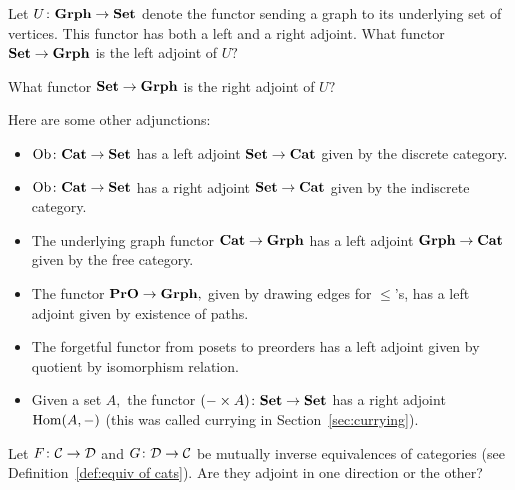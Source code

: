 \documentclass[../main/CT4S-EN-RU]{subfiles}
\begin{document}
\begin{exampleRUS}
\end{exampleRUS}

\begin{exerciseENG}
Let $U\colon{\mathbf{Grph}}\rightarrow{\mathbf{Set}}$ denote the functor sending a graph to its underlying set of vertices. This functor has both a left and a right adjoint. 
\sexc What functor ${\mathbf{Set}}\rightarrow{\mathbf{Grph}}$ is the left adjoint of $U?$
\item What functor ${\mathbf{Set}}\rightarrow{\mathbf{Grph}}$ is the right adjoint of $U?$
\endsexc
\end{exerciseENG}

\begin{exerciseRUS}
\end{exerciseRUS}

\begin{exampleENG}\label{ex:other adjunctions}
Here are some other adjunctions:

\begin{itemize}
\item $\operatorname{Ob}\colon{\mathbf{Cat}}\rightarrow{\mathbf{Set}}$ has a left adjoint ${\mathbf{Set}}\rightarrow{\mathbf{Cat}}$ given by the discrete category.
\item $\operatorname{Ob}\colon{\mathbf{Cat}}\rightarrow{\mathbf{Set}}$ has a right adjoint ${\mathbf{Set}}\rightarrow{\mathbf{Cat}}$ given by the indiscrete category.
\item The underlying graph functor ${\mathbf{Cat}}\rightarrow{\mathbf{Grph}}$ has a left adjoint ${\mathbf{Grph}}\rightarrow{\mathbf{Cat}}$ given by the free category.
\item The functor ${\mathbf{PrO}}\rightarrow{\mathbf{Grph}},$  given by drawing edges for $\leq$'s, has a left adjoint given by existence of paths.
\item The forgetful functor from posets to preorders has a left adjoint given by quotient by isomorphism relation.
\item Given a set $A,$ the functor $(-\times A)\colon{\mathbf{Set}}\rightarrow{\mathbf{Set}}$ has a right adjoint $\operatorname{Hom}(A,-)$ (this was called currying in Section~\ref{sec:currying}). 
\end{itemize}
\end{exampleENG}

\begin{exampleRUS}\label{ex:other adjunctions}
\end{exampleRUS}

\begin{exerciseENG}
Let $F\colon\mathcal{C}\rightarrow\mathcal{D}$ and $G\colon\mathcal{D}\rightarrow\mathcal{C}$ be mutually inverse equivalences of categories (see Definition~\ref{def:equiv of cats}). Are they adjoint in one direction or the other?
\end{exerciseENG}
\end{document}

